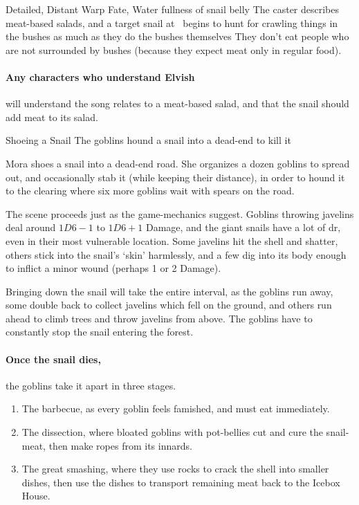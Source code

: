   {Detailed, Distant}%
  {Warp}%
  {Fate, Water}%
  {fullness of snail belly}%
  {The caster describes meat-based salads, and a target snail at \spellRange\ begins to hunt for crawling things in the bushes as much as they do the bushes themselves}%
  {They don't eat people who are not surrounded by bushes (because they expect meat only in regular food).}

\paragraph{Any characters who understand Elvish}
will understand the song relates to a meat-based salad, and that the snail should add meat to its salad.

{Shoeing a Snail}%
{The goblins hound a snail into a dead-end to kill it}%

Mora shoes a snail into a dead-end road.
She organizes a dozen goblins to spread out, and occasionally stab it (while keeping their distance), in order to hound it to the clearing where six more goblins wait with spears on the road.

The scene proceeds just as the game-mechanics suggest.
Goblins throwing javelins deal around $1D6-1$ to $1D6+1$ Damage, and the giant snails have a lot of \gls{dr}, even in their most vulnerable location.
Some javelins hit the shell and shatter, others stick into the snail's `skin' harmlessly, and a few dig into its body enough to inflict a minor wound (perhaps 1 or 2 Damage).

Bringing down the snail will take the entire \gls{interval}, as the goblins run away, some double back to collect javelins which fell on the ground, and others run ahead to climb trees and throw javelins from above.
The goblins have to constantly stop the snail entering the forest.

\paragraph{Once the snail dies,}
the goblins take it apart in three stages.

\begin{enumerate}
  \item
  The barbecue, as every goblin feels famished, and must eat immediately.
  \item
  The dissection, where bloated goblins with pot-bellies cut and cure the snail-meat, then make ropes from its innards.
  \item
  The great smashing, where they use rocks to crack the shell into smaller dishes, then use the dishes to transport remaining meat back to the Icebox House.
\end{enumerate}

